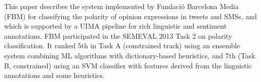 This paper describes the system implemented by Fundació Barcelona Media (FBM) for classifying the polarity of opinion expressions in tweets and SMSs, and
 which is supported by a UIMA pipeline for rich linguistic and sentiment
 annotations.  
   FBM participated in the SEMEVAL 2013 Task 2 on polarity classification. It
 ranked 5th in Task A (constrained track) using an ensemble system combining ML
 algorithms with dictionary-based heuristics, and 7th (Task B, constrained)
 using an SVM classifier with features derived from the linguistic annotations
 and some heuristics.

